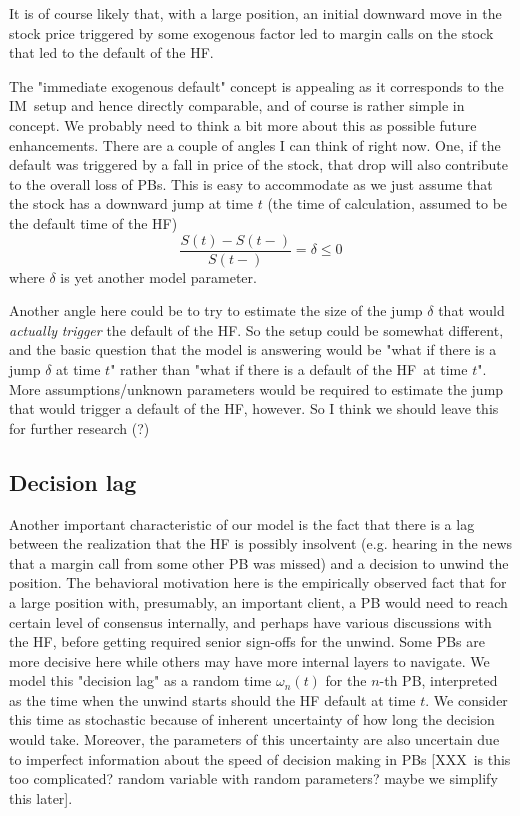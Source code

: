 \documentclass{article}
\begin{document}
It is of course likely that, with a large position, an initial downward move
in the stock price triggered by some exogenous factor led to margin calls on
the stock that led to the default of the HF. 

The "immediate exogenous default" concept is appealing as it corresponds to
the IM\ setup and hence directly comparable, and of course is rather simple
in concept. We probably need to think a bit more about this as possible
future enhancements. There are a couple of angles I can think of right now.
One, if the default was triggered by a fall in price of the stock, that drop
will also contribute to the overall loss of PBs. This is easy to accommodate
as we just assume that the stock has a downward jump at time $t$ (the time
of calculation, assumed to be the default time of the HF)%
\begin{equation}
\frac{S(t)-S(t-)}{S(t-)}=\delta \leq 0  \label{eq:deft1}
\end{equation}%
where $\delta $ is yet another model parameter.

Another angle here could be to try to estimate the size of the jump $\delta $
that would \emph{actually} \emph{trigger }the default of the HF. So the
setup could be somewhat different, and the basic question that the model is
answering would be "what if there is a jump $\delta $ at time $t$" rather
than "what if there is a default of the HF\ at time $t$". More
assumptions/unknown parameters would be required to estimate the jump that
would trigger a default of the HF, however. So I think we should leave this
for further research (?)

\subsection{Decision lag}

Another important characteristic of our model is the fact that there is a
lag between the realization that the HF is possibly insolvent (e.g. hearing
in the news that a margin call from some other PB was missed) and a decision
to unwind the position. The behavioral motivation here is the empirically
observed fact that for a large position with, presumably, an important
client, a PB would need to reach certain level of consensus internally, and
perhaps have various discussions with the HF, before getting required senior
sign-offs for the unwind. Some PBs are more decisive here while others may
have more internal layers to navigate. We model this "decision lag" as a
random time $\omega _{n}(t)$ for the $n$-th PB, interpreted as the time when
the unwind starts should the HF default at time $t.$ We consider this time
as stochastic because of inherent uncertainty of how long the decision would
take. Moreover, the parameters of this uncertainty are also uncertain due to
imperfect information about the speed of decision making in PBs [XXX\ is
this too complicated? random variable with random parameters? maybe we
simplify this later].
\end{document}
